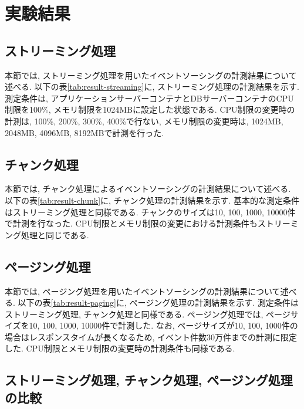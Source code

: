 \documentclass[../../main]{subfiles}
\begin{document}
    \section{実験結果}\label{sec:result}

    \subsection{ストリーミング処理}\label{subsec:result-streaming}

    本節では, ストリーミング処理を用いたイベントソーシングの計測結果について述べる. 以下の表\ref{tab:result-streaming}に, ストリーミング処理の計測結果を示す. 測定条件は, アプリケーションサーバーコンテナとDBサーバーコンテナのCPU制限を100\%, メモリ制限を1024MBに設定した状態である. CPU制限の変更時の計測は, 100\%, 200\%, 300\%, 400\%で行ない, メモリ制限の変更時は, 1024MB, 2048MB, 4096MB, 8192MBで計測を行った.

    

    \subsection{チャンク処理}\label{subsec:result-chunk}

    本節では, チャンク処理によるイベントソーシングの計測結果について述べる. 以下の表\ref{tab:result-chunk}に, チャンク処理の計測結果を示す. 基本的な測定条件はストリーミング処理と同様である. チャンクのサイズは10, 100, 1000, 10000件で計測を行なった. CPU制限とメモリ制限の変更における計測条件もストリーミング処理と同じである.

    

    \subsection{ページング処理}\label{subsec:result-paging}

    本節では, ページング処理を用いたイベントソーシングの計測結果について述べる. 以下の表\ref{tab:result-paging}に, ページング処理の計測結果を示す. 測定条件はストリーミング処理, チャンク処理と同様である. ページング処理では, ページサイズを10, 100, 1000, 10000件で計測した. なお, ページサイズが10, 100, 1000件の場合はレスポンスタイムが長くなるため, イベント件数30万件までの計測に限定した. CPU制限とメモリ制限の変更時の計測条件も同様である.

    

    \subsection{ストリーミング処理, チャンク処理, ページング処理の比較}\label{subsec:result-comparison}
\end{document}
